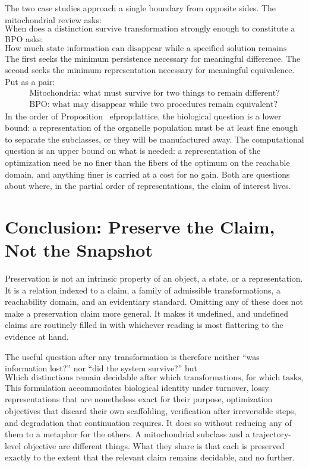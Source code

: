 \documentclass[11pt]{article}
\theoremstyle{remark}
\begin{document}
The two case studies approach a single boundary from opposite sides. The mitochondrial review asks:
\[
\text{When does a distinction survive transformation strongly enough to constitute a class?}
\]
BPO asks:
\[
\text{How much state information can disappear while a specified solution remains preserved?}
\]
The first seeks the minimum persistence necessary for meaningful difference. The second seeks the minimum representation necessary for meaningful equivalence. Put as a pair:
\[
\boxed{
\begin{array}{c}
\text{Mitochondria: what must survive for two things to remain different?}\\[4pt]
\text{BPO: what may disappear while two procedures remain equivalent?}
\end{array}}
\]
In the order of Proposition~
ef{prop:lattice}, the biological question is a lower bound: a representation of the organelle population must be at least fine enough to separate the subclasses, or they will be manufactured away. The computational question is an upper bound on what is needed: a representation of the optimization need be no finer than the fibers of the optimum on the reachable domain, and anything finer is carried at a cost for no gain. Both are questions about where, in the partial order of representations, the claim of interest lives.

\section{Conclusion: Preserve the Claim, Not the Snapshot}

Preservation is not an intrinsic property of an object, a state, or a representation. It is a relation indexed to a claim, a family of admissible transformations, a reachability domain, and an evidentiary standard. Omitting any of these does not make a preservation claim more general. It makes it undefined, and undefined claims are routinely filled in with whichever reading is most flattering to the evidence at hand.

The useful question after any transformation is therefore neither ``was information lost?'' nor ``did the system survive?'' but
\[
\boxed{\text{Which distinctions remain decidable after which transformations, for which tasks, and by what record?}}
\]
This formulation accommodates biological identity under turnover, lossy representations that are nonetheless exact for their purpose, optimization objectives that discard their own scaffolding, verification after irreversible steps, and degradation that continuation requires. It does so without reducing any of them to a metaphor for the others. A mitochondrial subclass and a trajectory-level objective are different things. What they share is that each is preserved exactly to the extent that the relevant claim remains decidable, and no further.
\end{document}
